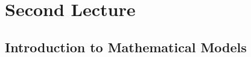 \setchapterpreamble[u]{\margintoc}
\chapter{Second Lecture}

\section[Intro. to Mathematical Models]{Introduction to Mathematical Models}

\blindtext